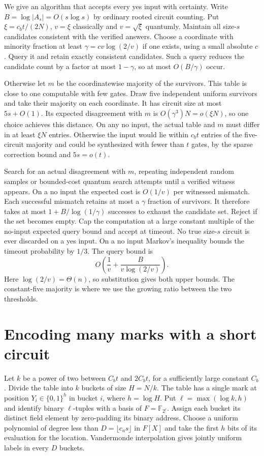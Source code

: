\documentclass[11pt]{article}
\begin{document}
We give an algorithm that accepts every yes input with certainty. Write $B=\log |A_s|=O(s\log s)$ by ordinary rooted circuit counting. Put $\xi=c_bt/(2N)$, $v=\xi$ classically and $v=\sqrt\xi$ quantumly. Maintain all size-$s$ candidates consistent with the verified answers. Choose a coordinate with minority fraction at least $\gamma=c v\log(2/v)$ if one exists, using a small absolute $c$. Query it and retain exactly consistent candidates. Such a query reduces the candidate count by a factor at most $1-\gamma$, so at most $O(B/\gamma)$ occur.

Otherwise let $m$ be the coordinatewise majority of the survivors. This table is close to one computable with few gates. Draw five independent uniform survivors and take their majority on each coordinate. It has circuit size at most $5s+O(1)$. Its expected disagreement with $m$ is $O(\gamma^3)N=o(\xi N)$, so one choice achieves this distance. On any no input, the actual table and $m$ must differ in at least $\xi N$ entries. Otherwise the input would lie within $c_b t$ entries of the five-circuit majority and could be synthesized with fewer than $t$ gates, by the sparse correction bound and $5s=o(t)$.

Search for an actual disagreement with $m$, repeating independent random samples or bounded-cost quantum search attempts until a verified witness appears. On a no input the expected cost is $O(1/v)$ per witnessed mismatch. Each successful mismatch retains at most a $\gamma$ fraction of survivors. It therefore takes at most $1+B/\log(1/\gamma)$ successes to exhaust the candidate set. Reject if the set becomes empty. Cap the computation at a large constant multiple of the no-input expected query bound and accept at timeout. No true size-$s$ circuit is ever discarded on a yes input. On a no input Markov's inequality bounds the timeout probability by $1/3$. The query bound is
\[
 O\!\left(\frac1v+\frac{B}{v\log(2/v)}\right).
\]
Here $\log(2/v)=\Theta(n)$, so substitution gives both upper bounds. The constant-five majority is where we use the growing ratio between the two thresholds.

\section{Encoding many marks with a short circuit}
Let $k$ be a power of two between $C_b t$ and $2C_b t$, for a sufficiently large constant $C_b$. Divide the table into $k$ buckets of size $H=N/k$. The table has a single mark at position $Y_i\in\{0,1\}^h$ in bucket $i$, where $h=\log H$. Put $\ell=\max(\log k,h)$ and identify binary $\ell$-tuples with a basis of $F=\mathbb F_{2^\ell}$. Assign each bucket its distinct field element by zero-padding its binary address. Choose a uniform polynomial of degree less than $D=\lfloor c_a s\rfloor$ in $F[X]$ and take the first $h$ bits of its evaluation for the location. Vandermonde interpolation gives jointly uniform labels in every $D$ buckets.
\end{document}
